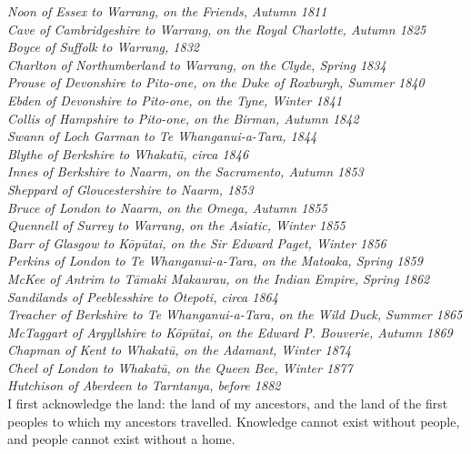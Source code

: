 \textit{Noon of Essex to Warrang, on the Friends, Autumn 1811} \\[5pt]
\textit{Cave of Cambridgeshire to Warrang, on the Royal Charlotte, Autumn 1825} \\[5pt]
\textit{Boyce of Suffolk to Warrang, 1832} \\[5pt] 
\textit{Charlton of Northumberland to Warrang, on the Clyde, Spring 1834} \\[5pt]
\textit{Prouse of Devonshire to Pito-one, on the Duke of Roxburgh, Summer 1840} \\[5pt]
\textit{Ebden of Devonshire to Pito-one, on the Tyne, Winter 1841} \\[5pt]
\textit{Collis of Hampshire to Pito-one, on the Birman, Autumn 1842} \\[5pt]
\textit{Swann of Loch Garman to Te Whanganui-a-Tara, 1844} \\[5pt] 
\textit{Blythe of Berkshire to Whakatū, circa 1846} \\[5pt]
\textit{Innes of Berkshire to Naarm, on the Sacramento, Autumn 1853} \\[5pt]
\textit{Sheppard of Gloucestershire to Naarm, 1853} \\[5pt] 
\textit{Bruce of London to Naarm, on the Omega, Autumn 1855} \\[5pt]
\textit{Quennell of Surrey to Warrang, on the Asiatic, Winter 1855} \\[5pt]
\textit{Barr of Glasgow to Kōpūtai, on the Sir Edward Paget, Winter 1856} \\[5pt] 
\textit{Perkins of London to Te Whanganui-a-Tara, on the Matoaka, Spring 1859} \\[5pt]
\textit{McKee of Antrim to Tāmaki Makaurau, on the Indian Empire, Spring 1862} \\[5pt]
\textit{Sandilands of Peeblesshire to Ōtepoti, circa 1864} \\[5pt] 
\textit{Treacher of Berkshire to Te Whanganui-a-Tara, on the Wild Duck, Summer 1865} \\[5pt]
\textit{McTaggart of Argyllshire to Kōpūtai, on the Edward P. Bouverie, Autumn 1869} \\[5pt] 
\textit{Chapman of Kent to Whakatū, on the Adamant, Winter 1874} \\[5pt]
\textit{Cheel of London to Whakatū, on the Queen Bee, Winter 1877} \\[5pt]  
\textit{Hutchison of Aberdeen to Tarntanya, before 1882} \\[5pt] 
I first acknowledge the land: the land of my ancestors, and the land of the first peoples to which my ancestors travelled. Knowledge cannot exist without people, and people cannot exist without a home.\\[5pt]
